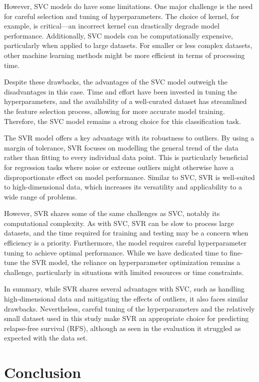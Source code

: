 \documentclass{article}
\begin{document}
However, SVC models do have some limitations. One major challenge is the need for careful selection and tuning of hyperparameters. The choice of kernel, for example, is critical—an incorrect kernel can drastically degrade model performance. Additionally, SVC models can be computationally expensive, particularly when applied to large datasets. For smaller or less complex datasets, other machine learning methods might be more efficient in terms of processing time.

Despite these drawbacks, the advantages of the SVC model outweigh the disadvantages in this case. Time and effort have been invested in tuning the hyperparameters, and the availability of a well-curated dataset has streamlined the feature selection process, allowing for more accurate model training. Therefore, the SVC model remains a strong choice for this classification task.

The SVR model offers a key advantage with its robustness to outliers. By using a margin of tolerance, SVR focuses on modelling the general trend of the data rather than fitting to every individual data point. This is particularly beneficial for regression tasks where noise or extreme outliers might otherwise have a disproportionate effect on model performance. Similar to SVC, SVR is well-suited to high-dimensional data, which increases its versatility and applicability to a wide range of problems.

However, SVR shares some of the same challenges as SVC, notably its computational complexity. As with SVC, SVR can be slow to process large datasets, and the time required for training and testing may be a concern when efficiency is a priority. Furthermore, the model requires careful hyperparameter tuning to achieve optimal performance. While we have dedicated time to fine-tune the SVR model, the reliance on hyperparameter optimization remains a challenge, particularly in situations with limited resources or time constraints.

In summary, while SVR shares several advantages with SVC, such as handling high-dimensional data and mitigating the effects of outliers, it also faces similar drawbacks. Nevertheless, careful tuning of the hyperparameters and the relatively small dataset used in this study make SVR an appropriate choice for predicting relapse-free survival (RFS), although as seen in the evaluation it struggled as expected with the data set.

\section{Conclusion}
\end{document}
